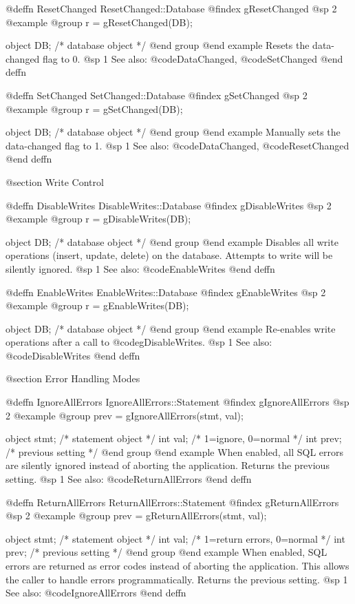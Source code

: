 @deffn {ResetChanged} ResetChanged::Database
@findex gResetChanged
@sp 2
@example
@group
r = gResetChanged(DB);

object  DB;   /*  database object  */
@end group
@end example
Resets the data-changed flag to 0.
@sp 1
See also:  @code{DataChanged}, @code{SetChanged}
@end deffn



@deffn {SetChanged} SetChanged::Database
@findex gSetChanged
@sp 2
@example
@group
r = gSetChanged(DB);

object  DB;   /*  database object  */
@end group
@end example
Manually sets the data-changed flag to 1.
@sp 1
See also:  @code{DataChanged}, @code{ResetChanged}
@end deffn



@section Write Control


@deffn {DisableWrites} DisableWrites::Database
@findex gDisableWrites
@sp 2
@example
@group
r = gDisableWrites(DB);

object  DB;   /*  database object  */
@end group
@end example
Disables all write operations (insert, update, delete) on the database.
Attempts to write will be silently ignored.
@sp 1
See also:  @code{EnableWrites}
@end deffn



@deffn {EnableWrites} EnableWrites::Database
@findex gEnableWrites
@sp 2
@example
@group
r = gEnableWrites(DB);

object  DB;   /*  database object  */
@end group
@end example
Re-enables write operations after a call to @code{gDisableWrites}.
@sp 1
See also:  @code{DisableWrites}
@end deffn



@section Error Handling Modes


@deffn {IgnoreAllErrors} IgnoreAllErrors::Statement
@findex gIgnoreAllErrors
@sp 2
@example
@group
prev = gIgnoreAllErrors(stmt, val);

object  stmt;   /*  statement object          */
int     val;    /*  1=ignore, 0=normal        */
int     prev;   /*  previous setting          */
@end group
@end example
When enabled, all SQL errors are silently ignored instead of aborting
the application.  Returns the previous setting.
@sp 1
See also:  @code{ReturnAllErrors}
@end deffn



@deffn {ReturnAllErrors} ReturnAllErrors::Statement
@findex gReturnAllErrors
@sp 2
@example
@group
prev = gReturnAllErrors(stmt, val);

object  stmt;   /*  statement object          */
int     val;    /*  1=return errors, 0=normal */
int     prev;   /*  previous setting          */
@end group
@end example
When enabled, SQL errors are returned as error codes instead of
aborting the application.  This allows the caller to handle errors
programmatically.  Returns the previous setting.
@sp 1
See also:  @code{IgnoreAllErrors}
@end deffn
